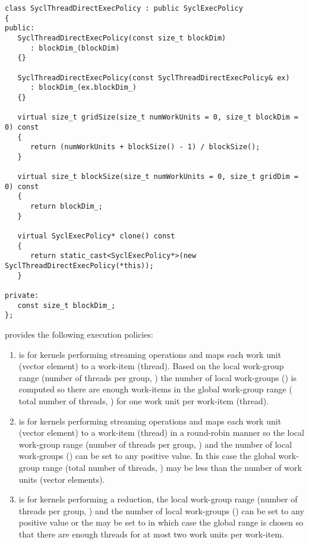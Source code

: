 \begin{verbatim}
class SyclThreadDirectExecPolicy : public SyclExecPolicy
{
public:
   SyclThreadDirectExecPolicy(const size_t blockDim)
      : blockDim_(blockDim)
   {}

   SyclThreadDirectExecPolicy(const SyclThreadDirectExecPolicy& ex)
      : blockDim_(ex.blockDim_)
   {}

   virtual size_t gridSize(size_t numWorkUnits = 0, size_t blockDim = 0) const
   {
      return (numWorkUnits + blockSize() - 1) / blockSize();
   }

   virtual size_t blockSize(size_t numWorkUnits = 0, size_t gridDim = 0) const
   {
      return blockDim_;
   }

   virtual SyclExecPolicy* clone() const
   {
      return static_cast<SyclExecPolicy*>(new SyclThreadDirectExecPolicy(*this));
   }

private:
   const size_t blockDim_;
};
\end{verbatim}

{\sundials} provides the following execution policies:
\begin{enumerate}
\item {}
  is for kernels performing streaming operations and maps each work unit
  (vector element) to a work-item (thread). Based on the local work-group range
  (number of threads per group, ) the number of local work-groups
  () is computed so there are enough work-items in the global
  work-group range ( total number of threads, ) for one
  work unit per work-item (thread).

\item  {}
  is for kernels performing streaming operations and maps each work unit
  (vector element) to a work-item (thread) in a round-robin manner so the local
  work-group range (number of threads per group, ) and the number
  of local work-groups () can be set to any positive value. In this
  case the global work-group range (total number of threads,
  ) may be less than the number of work units (vector
  elements).

\item {}
  is for kernels performing a reduction, the local work-group range (number
  of threads per group, ) and the number of local work-groups
  () can be set to any positive value or the  may be
  set to  in which case the global range is chosen so that there are
  enough threads for at most two work units per work-item.
\end{enumerate}


